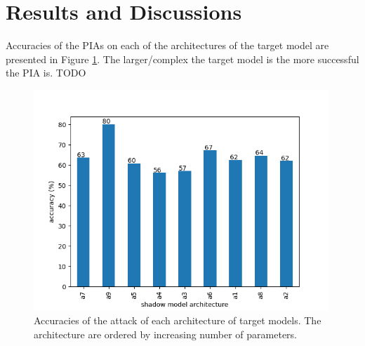 \documentclass[11pt]{article}
\begin{document}
\section{Results and Discussions}
Accuracies of the PIAs on each of the architectures of the target model are presented in Figure \ref{accuracies}. The larger/complex the target model is the more successful the PIA is. TODO

\begin{figure}[h!]
    \centering
    \begin{minipage}{\textwidth}
        \centering
        \includegraphics[width=0.99\textwidth]{accuracies.png} %
        \caption{Accuracies of the attack of each architecture of target models. The architecture are ordered by increasing number of parameters.}
        \label{accuracies}
    \end{minipage}\hfill
\end{figure}


\newpage
%


\end{document}
